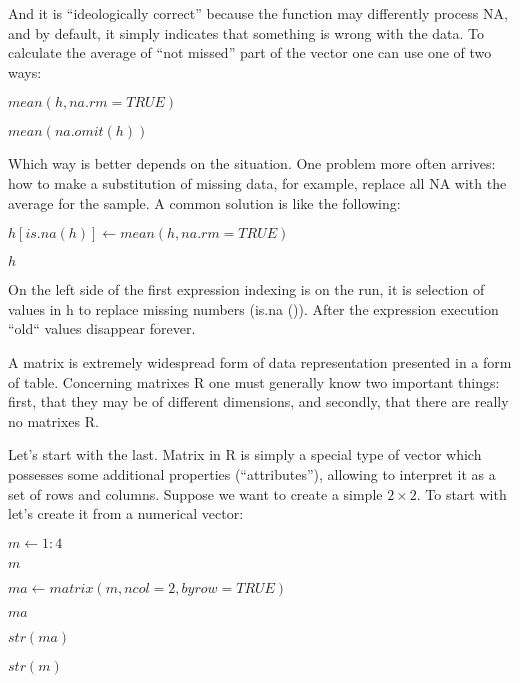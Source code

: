 \documentclass{beamer}
\begin{document}
\begin{frame}{}
And it is “ideologically correct” because the function may differently process NA, and by default, it simply indicates that something is wrong with the data. To calculate the average of “not missed” part of the vector one can use one of two ways:
\begin{center}

$mean(h, na.rm=TRUE)$

$mean(na.omit(h))$


\end{center}
\end{frame}


\begin{frame}{}
Which way is better depends on the situation. One problem more often arrives: how to make a substitution of missing data, for example, replace all NA with the average for the sample. A common solution is like the following:

\begin{center}

$h[is.na(h)] \leftarrow mean(h, na.rm=TRUE)$

$h$
\end{center}
\end{frame}


\begin{frame}{}
On the left side of the first expression indexing is on the run, it is selection of values in h to replace missing numbers (is.na ()). After the expression execution ``old`` values disappear forever.
\end{frame}


\begin{frame}{}
A matrix is extremely widespread form of data representation presented in a form of table. Concerning matrixes R one must generally know two important things: first, that they may be of different dimensions, and secondly, that there are really no matrixes R.
\end{frame}

\begin{frame}{}
Let's start with the last. Matrix in R is simply a special type of vector which possesses some additional properties (“attributes”), allowing to interpret it as a set of rows and columns. Suppose we want to create a simple \(2\times2\). To start with let’s create it from a numerical vector:
\begin{center}

$m \leftarrow 1:4$

$m$

$ma \leftarrow matrix(m, ncol=2, byrow=TRUE)$

$ma$

$str(ma)$

$str(m)$

\end{center}
\end{frame}
\end{document}

